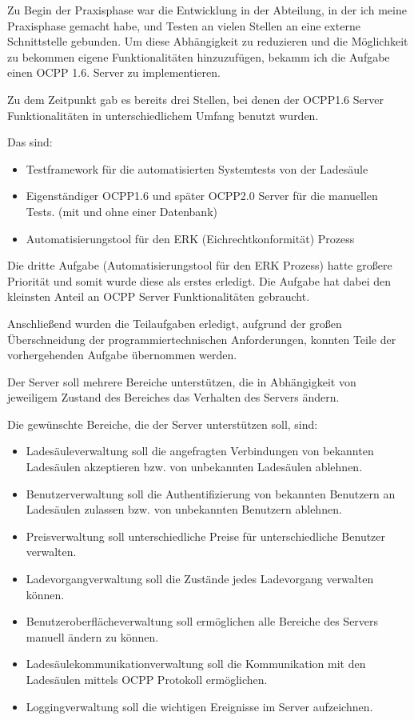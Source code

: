 Zu Begin der Praxisphase war die Entwicklung in der Abteilung, in der ich meine Praxisphase gemacht habe, und Testen an vielen Stellen an eine externe Schnittstelle gebunden.
Um diese Abhängigkeit zu reduzieren und die Möglichkeit zu bekommen eigene Funktionalitäten hinzuzufügen, bekamm ich die Aufgabe
einen OCPP 1.6. Server zu implementieren.

Zu dem Zeitpunkt gab es bereits drei Stellen, bei denen der OCPP1.6 Server Funktionalitäten in unterschiedlichem Umfang benutzt wurden.

Das sind:
\begin{itemize}
    \item Testframework für die automatisierten Systemtests von der Ladesäule
    \item Eigenständiger OCPP1.6 und später OCPP2.0 Server für die manuellen Tests. (mit und ohne einer Datenbank)
    \item Automatisierungstool für den ERK (Eichrechtkonformität) Prozess
\end{itemize}

Die dritte Aufgabe (Automatisierungstool für den ERK Prozess) hatte großere Priorität und somit wurde diese als erstes erledigt.
Die Aufgabe hat dabei den kleinsten Anteil an OCPP Server Funktionalitäten gebraucht.

Anschließend wurden die Teilaufgaben erledigt, aufgrund der großen Überschneidung der programmiertechnischen Anforderungen, 
konnten Teile der vorhergehenden Aufgabe übernommen werden.

Der Server soll mehrere Bereiche unterstützen, 
die in Abhängigkeit von jeweiligem Zustand des Bereiches das Verhalten des Servers ändern.

Die gewünschte Bereiche, die der Server unterstützen soll, sind:
\begin{itemize}
    \item Ladesäuleverwaltung soll die angefragten Verbindungen von bekannten Ladesäulen akzeptieren bzw. von unbekannten Ladesäulen ablehnen.
    \item Benutzerverwaltung soll die Authentifizierung von bekannten Benutzern an Ladesäulen zulassen bzw. von unbekannten Benutzern ablehnen.
    \item Preisverwaltung soll unterschiedliche Preise für unterschiedliche Benutzer verwalten.
    \item Ladevorgangverwaltung soll die Zustände jedes Ladevorgang verwalten können.
    \item Benutzeroberflächeverwaltung soll ermöglichen alle Bereiche des Servers manuell ändern zu können.
    \item Ladesäulekommunikationverwaltung soll die Kommunikation mit den Ladesäulen mittels OCPP Protokoll ermöglichen.
    \item Loggingverwaltung soll die wichtigen Ereignisse im Server aufzeichnen.
\end{itemize}